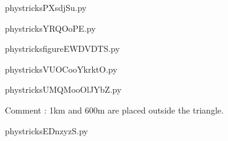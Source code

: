     \newcommand{\CaptionFigPXsdjSu}{<+Type your caption here+>}
    \begin{center}
        
    \end{center}
    phystricksPXsdjSu.py

    

    \clearpage
    


    \newcommand{\CaptionFigYRQOoPE}{<+Type your caption here+>}
    \begin{center}
        
    \end{center}
    phystricksYRQOoPE.py

    

    \clearpage
    


    \newcommand{\CaptionFigfigureEWDVDTS}{<+Type your caption here+>}
    \begin{center}
        
    \end{center}
    phystricksfigureEWDVDTS.py

    

    \clearpage
    


    \newcommand{\CaptionFigVUOCooYkrktO}{<+Type your caption here+>}
    \begin{center}
        
    \end{center}
    phystricksVUOCooYkrktO.py

    

    \clearpage
    


    \newcommand{\CaptionFigUMQMooOlJYbZ}{<+Type your caption here+>}
    \begin{center}
        
    \end{center}
    phystricksUMQMooOlJYbZ.py

    Comment : 1km and 600m are placed outside the triangle.

    \clearpage
    


    \newcommand{\CaptionFigEDnzyzS}{<+Type your caption here+>}
    \begin{center}
        
    \end{center}
    phystricksEDnzyzS.py

